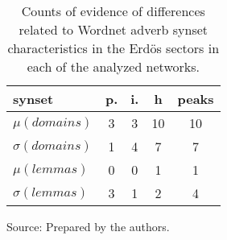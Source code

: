 \begin{table}[h!]
\begin{center}
\caption{Counts of evidence of differences related to Wordnet adverb synset characteristics in the Erd\"os sectors in each of the analyzed networks.}
\begin{tabular}{| l || c | c | c || c |}\hline
{\bf synset} & {\bf p.} & {\bf i.} & {\bf h} & {\bf peaks} \\\hline\hline
$\mu(domains)$ & 3  & 3  & 10  & 10 \\
$\sigma(domains)$ & 1  & 4  & 7  & 7 \\\hline
$\mu(lemmas)$ & 0  & 0  & 1  & 1 \\
$\sigma(lemmas)$ & 3  & 1  & 2  & 4 \\\hline
\end{tabular}
\begin{flushleft}
		Source: Prepared by the authors.\
\end{flushleft}
\end{center}
\end{table}
